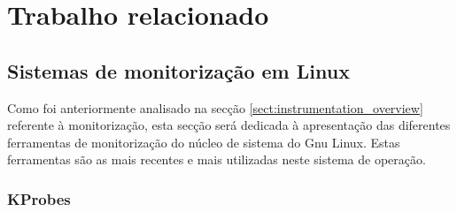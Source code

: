 \chapter{Trabalho relacionado}
\label{cap:trabrelacionado}

 
% 
% 



\section{Sistemas de monitorização em Linux}\label{sect:instrumentacao_casos_linux}

Como foi anteriormente analisado na secção \ref{sect:instrumentation_overview} referente à monitorização, esta secção será dedicada à apresentação das diferentes ferramentas de monitorização do núcleo de sistema do Gnu Linux.
Estas ferramentas são as mais recentes e mais utilizadas neste sistema de operação.


\subsection{KProbes}\label{sect:KProbes_overview}

